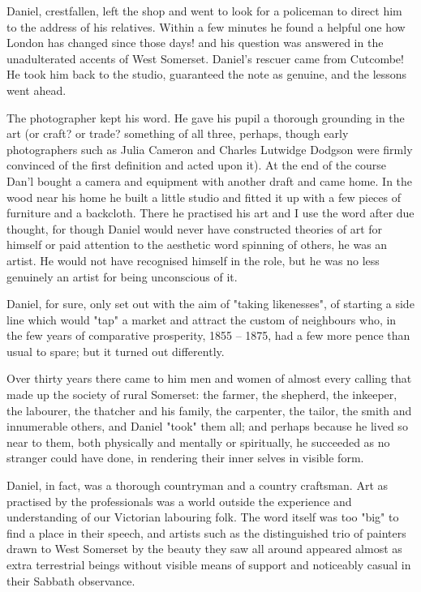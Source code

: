 Daniel, crestfallen, left the shop and went to look for a policeman to direct him to the address of his relatives. Within a few minutes he found a helpful one   how London has changed since those days!   and his question was answered in the unadulterated accents of West Somerset. Daniel's rescuer came from Cutcombe! He took him back to the studio, guaranteed the note as genuine, and the lessons went ahead.

The photographer kept his word. He gave his pupil a thorough grounding in the art (or craft? or trade?   something of all three, perhaps, though early photographers such as Julia Cameron and Charles Lutwidge Dodgson were firmly convinced of the first definition and acted upon it). At the end of the course Dan'l bought a camera and equipment with another draft and came home. In the wood near his home he built a little studio and fitted it up with a few pieces of furniture and a backcloth. There he practised his art   and I use the word after due thought, for though Daniel would never have constructed theories of art for himself or paid attention to the aesthetic word spinning of others, he was an artist. He would not have recognised himself in the role, but he was no less genuinely an artist for being unconscious of it. 

Daniel, for sure, only set out with the aim of "taking likenesses", of starting a side line which would "tap" a market and attract the custom of neighbours who, in the few years of comparative prosperity, 1855 – 1875, had a few more pence than usual to spare; but it turned out differently.

Over thirty years there came to him men and women of almost every calling that made up the society of rural Somerset: the farmer, the shepherd, the inkeeper, the labourer, the thatcher and his family, the carpenter, the tailor, the smith and innumerable others, and Daniel "took" them all; and perhaps because he lived so near to them, both physically and mentally or spiritually, he succeeded as no stranger could have done, in rendering their inner selves in visible form.

Daniel, in fact, was a thorough countryman and a country craftsman. Art as practised by the professionals was a world outside the experience and understanding of our Victorian labouring folk. The word itself was too "big" to find a place in their speech, and artists   such as the distinguished trio of painters drawn to West Somerset by the beauty they saw all around   appeared almost as extra terrestrial beings without visible means of support and noticeably casual in their Sabbath observance. 

